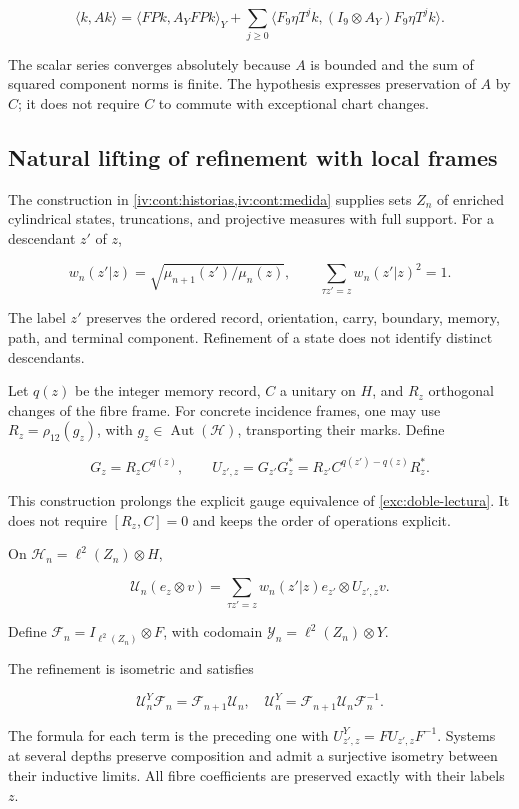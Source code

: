 \[
\langle k,Ak\rangle
=\langle FPk,A_YFPk\rangle_Y
+\sum_{j\ge0}\langle F_9\eta T^jk,(I_9\otimes A_Y)F_9\eta T^jk\rangle.
\]

The scalar series converges absolutely because \(A\) is bounded and the sum of squared component norms is finite. The hypothesis expresses preservation of \(A\) by \(C\); it does not require \(C\) to commute with exceptional chart changes.

\subsection{Natural lifting of refinement with local frames}\label{nuc05:refinamiento}

The construction in \cref{iv:cont:historias,iv:cont:medida} supplies sets \(Z_n\) of enriched cylindrical states, truncations, and projective measures with full support. For a descendant \(z'\) of \(z\),

\[
w_n(z'|z)=\sqrt{\mu_{n+1}(z')/\mu_n(z)},\qquad
\sum_{\tau z'=z}w_n(z'|z)^2=1.
\]

The label \(z'\) preserves the ordered record, orientation, carry, boundary, memory, path, and terminal component. Refinement of a state does not identify distinct descendants.

Let \(q(z)\) be the integer memory record, \(C\) a unitary on \(H\), and \(R_z\) orthogonal changes of the fibre frame. For concrete incidence frames, one may use \(R_z=\rho_{12}(g_z)\), with \(g_z\in\operatorname{Aut}(\mathcal H)\), transporting their marks. Define

\[
G_z=R_zC^{q(z)},\qquad
U_{z',z}=G_{z'}G_z^*
=R_{z'}C^{q(z')-q(z)}R_z^*.
\]

This construction prolongs the explicit gauge equivalence of \cref{exc:doble-lectura}. It does not require \([R_z,C]=0\) and keeps the order of operations explicit.

On \(\mathscr H_n=\ell^2(Z_n)\otimes H\),

\[
\mathscr U_n(e_z\otimes v)
=\sum_{\tau z'=z}w_n(z'|z)e_{z'}\otimes U_{z',z}v.
\]

Define \(\mathscr F_n=I_{\ell^2(Z_n)}\otimes F\), with codomain \(\mathscr Y_n=\ell^2(Z_n)\otimes Y\).

\begin{theorem}
The refinement is isometric and satisfies

\[
\mathscr U^Y_n\mathscr F_n=\mathscr F_{n+1}\mathscr U_n,
\quad
\mathscr U^Y_n=\mathscr F_{n+1}\mathscr U_n\mathscr F_n^{-1}.
\]

The formula for each term is the preceding one with \(U^Y_{z',z}=FU_{z',z}F^{-1}\). Systems at several depths preserve composition and admit a surjective isometry between their inductive limits. All fibre coefficients are preserved exactly with their labels \(z\).
\end{theorem}

